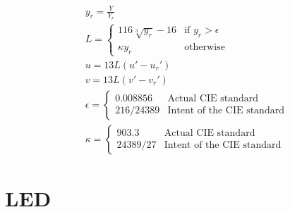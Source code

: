 \documentclass[11pt]{scrartcl}
\begin{document}
\begin{align}\label{Equ:10}
    &y_r = \frac{Y}{Y_r}\\
    &L = \left\{
        \begin{array}{ll}
            116 \sqrt[3]{y_r} - 16 & \text{if } y_r > \epsilon \\
            \kappa y_r & \text{otherwise}
        \end{array}
        \right.\\
    &u = 13 L (u' - u_r')\\
    &v = 13 L (v' - v_r')\\
    &\epsilon = \left\{
        \begin{array}{ll}
            {0.008856} & \text{Actual CIE standard} \\
            {216 / 24389} & \text{Intent of the CIE standard}
        \end{array}
        \right.\\
    &\kappa = \left\{
        \begin{array}{ll}
            {903.3} & \text{Actual CIE standard} \\
            {24389 / 27} & \text{Intent of the CIE standard}
        \end{array}
        \right.
\end{align}
\cite{lindbloom}
\clearpage

\section{LED}
\end{document}
